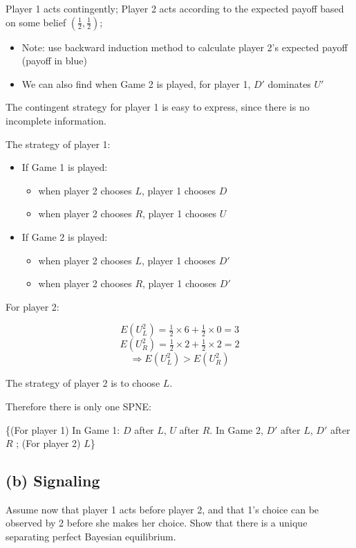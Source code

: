 \documentclass{article}
\begin{document}
\begin{mdframed}[backgroundcolor=blue!20,linecolor=white]
Player 1 acts contingently; Player 2 acts according to the expected payoff based on some belief $(\tfrac12,\tfrac12)$; 
\begin{itemize}
\item Note: use backward induction method to calculate player 2's expected payoff (payoff in blue)
\item We can also find when Game 2 is played, for player 1, $D'$ dominates $U'$
\end{itemize}

The contingent strategy for player 1 is easy to express, since there is no incomplete information.

\end{mdframed}

The strategy of player 1:
\begin{itemize}
\item If Game 1 is played:
\begin{itemize}
\item when player 2 chooses $L$, player 1 chooses $D$
\item when player 2 chooses $R$, player 1 chooses $U$
\end{itemize}
\item If Game 2 is played:
\begin{itemize}
\item when player 2 chooses $L$, player 1 chooses $D'$
\item when player 2 chooses $R$, player 1 chooses $D'$
\end{itemize}
\end{itemize}

For player 2:


$$E(U^2_L) = \tfrac12 \times 6 +\tfrac12 \times 0 = 3$$
$$E(U^2_R) = \tfrac12 \times 2 +\tfrac12 \times 2 = 2$$
$$\Rightarrow E(U^2_L) > E(U^2_R)$$

The strategy of player 2 is to choose $L$.

\medskip

Therefore there is only one SPNE:

\{(For player 1) In Game 1: $D$ after $L$, $U$ after $R$. In Game 2, $D'$ after $L$, $D'$ after $R$ ; (For player 2) $L$\}


\subsection{(b) Signaling} Assume now that player 1 acts before player 2, and that 1's choice can be observed by 2 before she makes her choice. Show that there is a unique separating perfect Bayesian equilibrium.
\end{document}
